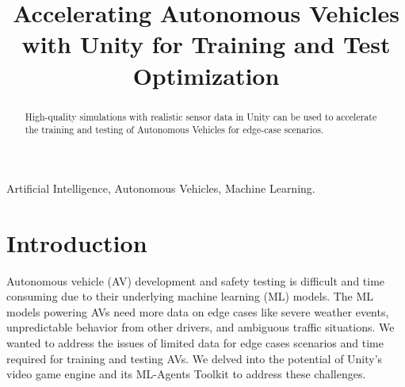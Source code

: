 \documentclass[conference]{IEEEtran}
\begin{document}
\title{Accelerating Autonomous Vehicles with Unity for Training and Test Optimization}


\author{
\and
{}
\and
{}
\and
{}
}
\maketitle

\begin{abstract}
High-quality simulations with realistic sensor data in Unity can be used to accelerate the training and testing of Autonomous Vehicles for edge-case scenarios.
\end{abstract}

\begin{IEEEkeywords}
Artificial Intelligence, Autonomous Vehicles, Machine Learning.
\end{IEEEkeywords}

\section{Introduction}
Autonomous vehicle (AV) development and safety testing is difficult and time consuming due to their underlying machine learning (ML) models\cite{koopman2016}.
The ML models powering AVs need more data on edge cases like severe weather events, unpredictable behavior from other drivers, and ambiguous traffic situations.
We wanted to address the issues of limited data for edge cases scenarios and time required for training and testing AVs.
We delved into the potential of Unity’s video game engine and its ML-Agents Toolkit to address these challenges.
\end{document}
